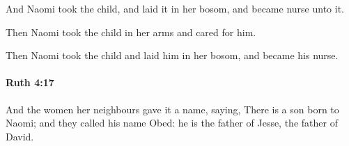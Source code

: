 			\begin{versebox}
					\item[BHS] 
					\item[LXX] 
					\item[ASV] And Naomi took the child, and laid it in her bosom, and became nurse unto it.
					\item[NIV] Then Naomi took the child in her arms and cared for him.
					\item[NRSV] Then Naomi took the child and laid him in her bosom, and became his nurse.
			\end{versebox}

		\paragraph{Ruth 4:17} %
			\label{RUTH-4-17}

			And the women her neighbours gave it a name, saying, There is a son born to Naomi; and they called his name Obed: he is the father of Jesse, the father of David.

